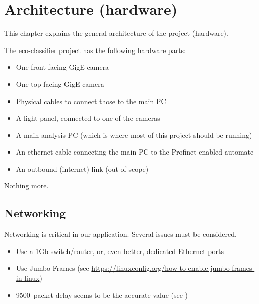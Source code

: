 \chapter{Architecture (hardware)}
\label{chapter:hardwarearchitecture}

This chapter explains the general architecture of the project (hardware).


The eco-classifier project has the following hardware parts:

\begin{itemize}
    \item One front-facing GigE camera
    \item One top-facing GigE camera
    \item Physical cables to connect those to the main PC
    \item A light panel, connected to one of the cameras
    \item A main analysis PC (which is where most of this project should be running)
    \item An ethernet cable connecting the main PC to the Profinet-enabled automate
    \item An outbound (internet) link (out of scope)
\end{itemize}

Nothing more.


\section{Networking}

Networking is critical in our application. Several issues must be considered.

\begin{itemize}
    \item Use a 1Gb switch/router, or, even better, dedicated Ethernet ports
    \item Use Jumbo Frames (see \url{https://linuxconfig.org/how-to-enable-jumbo-frames-in-linux})
    \item 9500~packet delay seems to be the accurate value (see )
\end{itemize}
